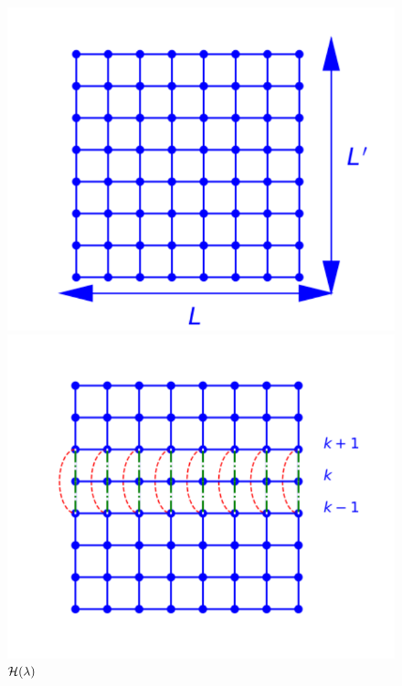 \begin{figure}
	\begin{minipage}[t]{0.3\linewidth}
		\includegraphics[width=\linewidth]{numerical/cross-h0.pdf}
		\caption*{$\mH_0$}
	\end{minipage}
	\begin{minipage}[t]{0.3\linewidth}
		\includegraphics[width=\linewidth]{numerical/cross-hlambda.pdf}
		\caption*{$\mathcal{H}(\lambda)$}		
	\end{minipage}
	\centering
	\begin{minipage}[t]{0.3\linewidth}

\end{minipage}
\end{figure}
